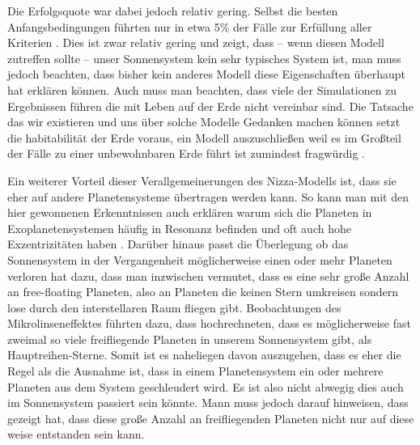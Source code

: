 \documentclass[12pt,a4paper,twoside,open=right,bibliography=totoc]{scrbook}
\renewcommand{\cite}{ \citep}
\begin{document}
Die Erfolgsquote war dabei jedoch relativ gering. Selbst die besten Anfangsbedingungen führten nur in etwa 5\% der Fälle zur Erfüllung aller Kriterien\cite{Nesvorny2012}. Dies ist zwar relativ gering und zeigt, dass -- wenn diesen Modell zutreffen sollte -- unser Sonnensystem kein sehr typisches System ist, man muss jedoch beachten, dass bisher kein anderes Modell diese Eigenschaften überhaupt hat erklären können.
Auch muss man beachten, dass viele der Simulationen zu Ergebnissen führen die mit Leben auf der Erde nicht vereinbar sind. Die Tatsache das wir existieren und uns über solche Modelle Gedanken machen können setzt die habitabilität der Erde voraus, ein Modell auszuschließen weil es im Großteil der Fälle zu einer unbewohnbaren Erde führt ist zumindest fragwürdig\cite{Brasser2009}.

Ein weiterer Vorteil dieser Verallgemeinerungen des Nizza-Modells ist, dass sie eher auf andere Planetensysteme übertragen werden kann. So kann man mit den hier gewonnenen Erkenntnissen auch erklären warum sich die Planeten in Exoplanetensystemen häufig in Resonanz befinden und oft auch hohe Exzentrizitäten haben\cite{Weidenschilling1996,Rasio1996,Marcy2001,Nesvorny2012}.
Darüber hinaus passt die Überlegung ob das Sonnensystem in der Vergangenheit möglicherweise einen oder mehr Planeten verloren hat dazu, dass man inzwischen vermutet, dass es eine sehr große Anzahl an free-floating Planeten, also an Planeten die keinen Stern umkreisen sondern lose durch den interstellaren Raum fliegen gibt.
Beobachtungen des Mikrolinseneffektes führten dazu, dass \cite{Sumi2011} hochrechneten, dass es möglicherweise fast zweimal so viele freifliegende Planeten in unserem Sonnensystem gibt, als Hauptreihen-Sterne.
Somit ist es naheliegen davon auszugehen, dass es eher die Regel als die Ausnahme ist, dass in einem Planetensystem ein oder mehrere Planeten aus dem System geschleudert wird. Es ist also nicht abwegig dies auch im Sonnensystem passiert sein könnte.
Mann muss jedoch darauf hinweisen, dass \cite{Veras2012} gezeigt hat, dass diese große Anzahl an freifliegenden Planeten nicht nur auf diese weise entstanden sein kann.
                                               
\end{document}
